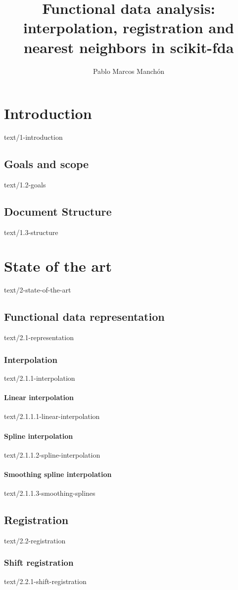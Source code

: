 \documentclass[epsbased,copyleft,final,loe, lof,extendedindex,firstnumbered,tfg,english]{tfgtfmthesisuam}
\author{Pablo Marcos Manchón}
\title{Functional data analysis: interpolation, registration and nearest neighbors in scikit-fda}
\begin{document}
\chapter{Introduction\label{CAP:INTRODUCTION}}{text/1-introduction}
\section{Goals and scope\label{SEC:GOALS}}{text/1.2-goals}
\section{Document Structure\label{SEC:STRUCTURE}}{text/1.3-structure}


\chapter{State of the art\label{CAP:STATEOFART}}{text/2-state-of-the-art}

\section{Functional data representation\label{SEC:REPRESENTATION}}{text/2.1-representation}
  \subsection{Interpolation\label{SEC:INTERPOLATION}}{text/2.1.1-interpolation}
    \subsubsection{Linear interpolation\label{SSEC:LINEAR}}{text/2.1.1.1-linear-interpolation}
    \subsubsection{Spline interpolation\label{SSEC:SPLINES}}{text/2.1.1.2-spline-interpolation}
    \subsubsection{Smoothing spline interpolation\label{SSEC:SSPLINES}}{text/2.1.1.3-smoothing-splines}

\section{Registration\label{SEC:REGISTRATION}}{text/2.2-registration}
  \subsection{Shift registration\label{SEC:SHIFT}}{text/2.2.1-shift-registration}
\end{document}
